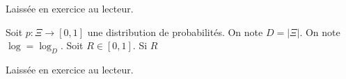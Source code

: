 \begin{explanation}
    Laissée en exercice au lecteur. 
\end{explanation}

\begin{theorem}
    Soit \(p : \Xi \to [0,1]\) une distribution de probabilités. On note \(D = \lvert \Xi  \rvert \). On note \(\log  = \log _{D}\). Soit \(R \in [0,1]\). Si \(R \)     
\end{theorem}

\begin{explanation}
    Laissée en exercice au lecteur. 
\end{explanation}